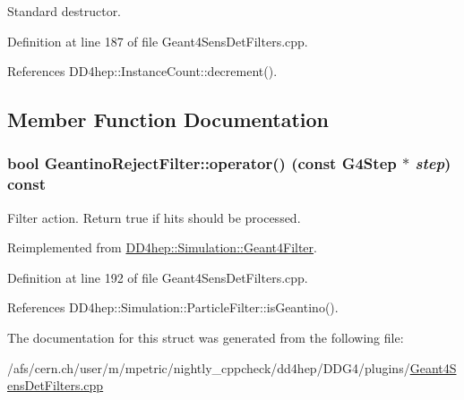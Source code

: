 Standard destructor. 

Definition at line 187 of file Geant4SensDetFilters.cpp.

References DD4hep::InstanceCount::decrement().

\subsection{Member Function Documentation}
\hypertarget{struct_d_d4hep_1_1_simulation_1_1_geantino_reject_filter_aa8d8f1469357f1ed18be0ed4ab7348b9}{
\subsubsection[{operator()}]{\setlength{\rightskip}{0pt plus 5cm}bool GeantinoRejectFilter::operator() (const G4Step $\ast$ {\em step}) const}}
\label{struct_d_d4hep_1_1_simulation_1_1_geantino_reject_filter_aa8d8f1469357f1ed18be0ed4ab7348b9}


Filter action. Return true if hits should be processed. 

Reimplemented from \hyperlink{class_d_d4hep_1_1_simulation_1_1_geant4_filter_afff6fafea1b7c0c7d61834ae0a51a23f}{DD4hep::Simulation::Geant4Filter}.

Definition at line 192 of file Geant4SensDetFilters.cpp.

References DD4hep::Simulation::ParticleFilter::isGeantino().

The documentation for this struct was generated from the following file:\begin{DoxyCompactItemize}
\item 
/afs/cern.ch/user/m/mpetric/nightly\_\-cppcheck/dd4hep/DDG4/plugins/\hyperlink{_geant4_sens_det_filters_8cpp}{Geant4SensDetFilters.cpp}\end{DoxyCompactItemize}
